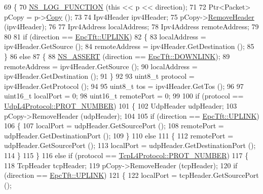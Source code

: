\begin{DoxyCode}
69 \{
70   \hyperlink{log-macros-disabled_8h_a90b90d5bad1f39cb1b64923ea94c0761}{NS\_LOG\_FUNCTION} (\textcolor{keyword}{this} << p << direction);
71 
72   Ptr<Packet> pCopy = p->\hyperlink{classns3_1_1Packet_a5d5c70802a5f77fc5f0001e0cfc1898b}{Copy} ();
73 
74   Ipv4Header ipv4Header;
75   pCopy->\hyperlink{classns3_1_1Packet_a0961eccf975d75f902d40956c93ba63e}{RemoveHeader} (ipv4Header);
76 
77   Ipv4Address localAddress;
78   Ipv4Address remoteAddress;
79 
80   
81   \textcolor{keywordflow}{if} (direction ==  \hyperlink{classns3_1_1EpcTft_a6037510585658e017a8011862ce56946a5327d0aa05b24c5033cf3ae0f5156a26}{EpcTft::UPLINK})
82     \{
83       localAddress = ipv4Header.GetSource ();
84       remoteAddress = ipv4Header.GetDestination ();
85     \}
86   \textcolor{keywordflow}{else}
87     \{ 
88       \hyperlink{assert_8h_a6dccdb0de9b252f60088ce281c49d052}{NS\_ASSERT} (direction ==  \hyperlink{classns3_1_1EpcTft_a6037510585658e017a8011862ce56946a2e647a08cf9f96c76b5379e3979f2cad}{EpcTft::DOWNLINK});
89       remoteAddress = ipv4Header.GetSource ();
90       localAddress = ipv4Header.GetDestination ();      
91     \}
92   
93   uint8\_t protocol = ipv4Header.GetProtocol ();
94 
95   uint8\_t tos = ipv4Header.GetTos ();
96 
97   uint16\_t localPort = 0;
98   uint16\_t remotePort = 0;
99 
100   \textcolor{keywordflow}{if} (protocol == \hyperlink{classns3_1_1UdpL4Protocol_ad370801b3d1a166e831020a777c41047}{UdpL4Protocol::PROT\_NUMBER})
101     \{
102       UdpHeader udpHeader;
103       pCopy->RemoveHeader (udpHeader);
104 
105       \textcolor{keywordflow}{if} (direction ==  \hyperlink{classns3_1_1EpcTft_a6037510585658e017a8011862ce56946a5327d0aa05b24c5033cf3ae0f5156a26}{EpcTft::UPLINK})
106         \{
107           localPort = udpHeader.GetSourcePort ();
108           remotePort = udpHeader.GetDestinationPort ();
109         \}
110       \textcolor{keywordflow}{else}
111         \{
112           remotePort = udpHeader.GetSourcePort ();
113           localPort = udpHeader.GetDestinationPort ();
114         \}
115     \}
116   \textcolor{keywordflow}{else} \textcolor{keywordflow}{if} (protocol == \hyperlink{classns3_1_1TcpL4Protocol_ac6c1cee44ae21227e755678bb52dbc89}{TcpL4Protocol::PROT\_NUMBER})
117     \{
118       TcpHeader tcpHeader;
119       pCopy->RemoveHeader (tcpHeader);
120       \textcolor{keywordflow}{if} (direction ==  \hyperlink{classns3_1_1EpcTft_a6037510585658e017a8011862ce56946a5327d0aa05b24c5033cf3ae0f5156a26}{EpcTft::UPLINK})
121         \{
122           localPort = tcpHeader.GetSourcePort ();

\end{DoxyCode}
